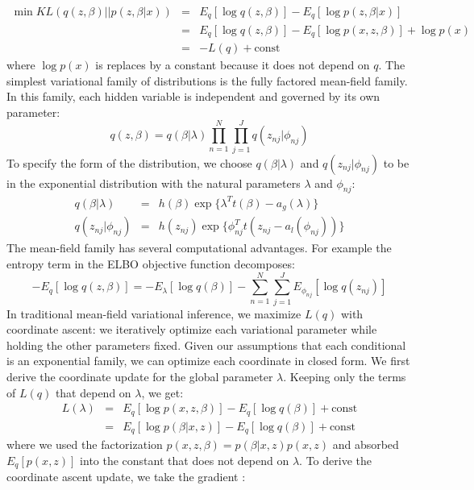 \begin{eqnarray}
    \min KL(q(z,\beta)||p(z,\beta|x)) &=& E_q[\log q(z,\beta)] - E_q[\log p(z,\beta|x)] \\
    &=& E_q[\log q(z,\beta)] - E_q[\log p(x,z,\beta)] + \log p(x) \\
    &=& -L(q) + \mathrm{const}
\end{eqnarray}
where $\log p(x)$ is replaces by a constant because it does not depend on $q$. The simplest variational family of distributions is the fully factored mean-field family. In this family, each hidden variable is independent and governed by its own parameter:
\begin{equation}
    q(z,\beta) = q(\beta|\lambda)\prod_{n=1}^{N}\prod_{j=1}^{J}q(z_{nj}|\phi_{nj})
\end{equation}
To specify the form of the distribution, we choose $q(\beta|\lambda)$ and $q(z_{nj}|\phi_{nj})$ to be in the exponential distribution with the natural parameters $\lambda$ and $\phi_{nj}$:
\begin{eqnarray}
   q(\beta|\lambda) &=& h(\beta)\exp\{\lambda^{T}t(\beta) - a_{g}(\lambda)\}\\
   q(z_{nj}|\phi_{nj}) &=& h(z_{nj})\exp\{\phi_{nj}^{T}t(z_{nj} - a_{l}(\phi_{nj}))\}
\end{eqnarray}
The mean-field family has several computational advantages. For example the entropy term in the ELBO objective function decomposes:
\begin{equation}
   -E_q[\log q(z,\beta)] = -E_{\lambda}[\log q(\beta)] - \sum_{n=1}^{N}\sum_{j=1}^{J}E_{\phi_{nj}}[\log q(z_{nj})]
\end{equation}
In traditional mean-field variational inference, we maximize $L(q)$ with coordinate ascent: we iteratively optimize each variational parameter while holding the other parameters fixed. Given our assumptions that each conditional is an exponential family, we can optimize each coordinate in closed form. We first derive the coordinate update for the global parameter $\lambda$. Keeping only the terms of $L(q)$ that depend on $\lambda$, we get:
\begin{eqnarray}
    L(\lambda) &=& E_q[\log p(x,z,\beta)] - E_q[\log q(\beta)] + \mathrm{const} \\
    &=& E_q[\log p(\beta|x,z)] - E_q[\log q(\beta)] + \mathrm{const}
\end{eqnarray}
where we used the factorization $p(x,z,\beta) = p(\beta|x,z)p(x,z)$ and absorbed $E_q[p(x,z)]$ into the constant that does not depend on $\lambda$. To derive the coordinate ascent update, we take the gradient \cite{SVI2013}:
